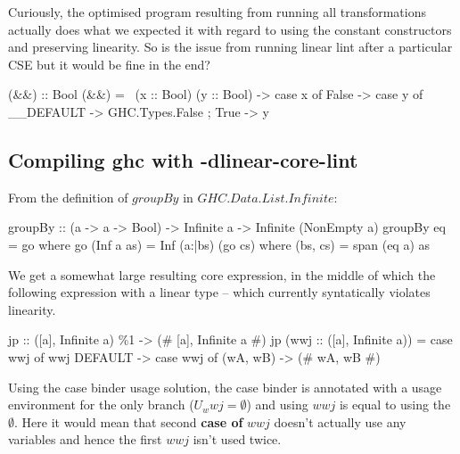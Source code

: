 \documentclass[]{lwnovathesis}
\begin{document}
Curiously, the optimised program resulting from running all transformations
actually does what we expected it with regard to using the constant constructors
and preserving linearity. So is the issue from running linear lint after a
particular CSE but it would be fine in the end?
\begin{code}
(&&) :: Bool %
(&&) = \ (x :: Bool) (y :: Bool) ->
  case x of {
    False -> case y of { __DEFAULT -> GHC.Types.False };
    True -> y
  }
\end{code}

\subsection{Compiling ghc with -dlinear-core-lint}

From the definition of $\mathit{groupBy}$ in $\mathit{GHC.Data.List.Infinite}$:

\begin{code}
groupBy :: (a -> a -> Bool) -> Infinite a -> Infinite (NonEmpty a)
groupBy eq = go
  where
    go (Inf a as) = Inf (a:|bs) (go cs)
      where (bs, cs) = span (eq a) as
\end{code}

We get a somewhat large resulting core expression, in the middle of which the
following expression with a linear type -- which currently syntatically violates
linearity.

\begin{code}
jp :: ([a], Infinite a) \%1 -> (# [a], Infinite a #)
jp (wwj :: ([a], Infinite a)) =
    case wwj of wwj {
        DEFAULT -> case wwj of { (wA, wB) -> (# wA, wB #) }
    }
\end{code}

Using the case binder usage solution, the case binder is annotated with a usage
environment for the only branch ($U_wwj = \emptyset$) and using $wwj$ is equal
to using the $\emptyset$. Here it would mean that second \textbf{case of} $wwj$
doesn't actually use any variables and hence the first $wwj$ isn't used twice.


\end{document}
